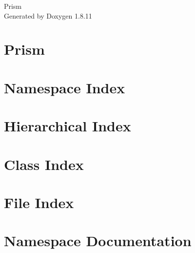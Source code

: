 \documentclass[twoside]{book}
\newcommand{\+}{\discretionary{\mbox{\scriptsize$\hookleftarrow$}}{}{}}
\newcommand{\clearemptydoublepage}{%
  \newpage{\pagestyle{empty}\cleardoublepage}%
}
\begin{document}
\hypersetup{pageanchor=false,
             bookmarksnumbered=true,
             pdfencoding=unicode
            }
\begin{titlepage}
\vspace*{7cm}
\begin{center}%
{\Large Prism }\\
\vspace*{1cm}
{\large Generated by Doxygen 1.8.11}\\
\end{center}
\end{titlepage}
\clearemptydoublepage
\tableofcontents
\clearemptydoublepage
{}
\hypersetup{pageanchor=true}

\chapter{Prism}
\label{md_README}
\hypertarget{md_README}{}

\chapter{Namespace Index}

\chapter{Hierarchical Index}

\chapter{Class Index}

\chapter{File Index}

\chapter{Namespace Documentation}

\end{document}
